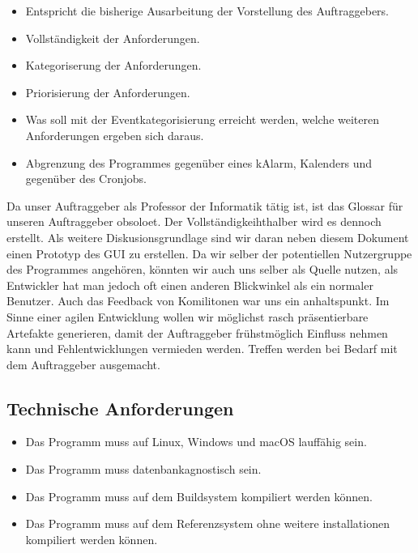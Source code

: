 \documentclass[11pt,titelpage]{scrartcl}
\begin{document}
\begin{itemize}
\item Entspricht die bisherige Ausarbeitung der Vorstellung des Auftraggebers.
\item Vollständigkeit der Anforderungen.
\item Kategoriserung der Anforderungen.
\item Priorisierung der Anforderungen.
\item Was soll mit der Eventkategorisierung erreicht werden, welche weiteren Anforderungen ergeben sich daraus.
\item Abgrenzung des Programmes gegenüber eines kAlarm, Kalenders und gegenüber des Cronjobs.
\end{itemize}
Da unser Auftraggeber als Professor der Informatik tätig ist, ist das Glossar für unseren Auftraggeber obsoloet. Der
Vollständigkeihthalber wird es dennoch erstellt.
Als weitere Diskusionsgrundlage sind wir daran neben diesem Dokument einen Prototyp des GUI zu erstellen.
Da wir selber der potentiellen Nutzergruppe des Programmes angehören, könnten wir auch uns selber als Quelle nutzen,
als Entwickler hat man jedoch oft einen anderen Blickwinkel als ein normaler Benutzer.
Auch das Feedback von Komilitonen war uns ein anhaltspunkt.
Im Sinne einer agilen Entwicklung wollen wir möglichst rasch präsentierbare Artefakte generieren, damit der
Auftraggeber frühstmöglich Einfluss nehmen kann und Fehlentwicklungen vermieden werden. Treffen werden bei Bedarf mit
dem Auftraggeber ausgemacht.


\subsection{Technische Anforderungen}

\begin{itemize}
 \item Das Programm muss auf Linux, Windows und macOS lauffähig sein.
 \item Das Programm muss datenbankagnostisch sein.
 \item Das Programm muss auf dem Buildsystem kompiliert werden können.
 \item Das Programm muss auf dem Referenzsystem ohne weitere installationen kompiliert werden können.
\end{itemize}
\end{document}
